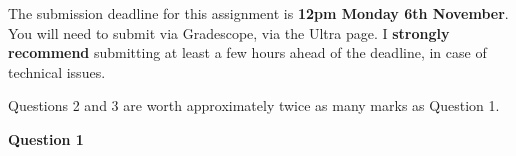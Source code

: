 \documentclass[11pt,a4paper]{article}
\begin{document}




The submission deadline for this assignment is \textbf{12pm Monday 6th November}. You will need to submit via Gradescope, via the Ultra page. I \textbf{strongly recommend} submitting at least a few hours ahead of the deadline, in case of technical issues.

Questions 2 and 3 are worth approximately twice as many marks as Question 1.



\vspace{0.2cm}

\textbf{Question 1}

\vspace{0.2cm}
\end{document}
